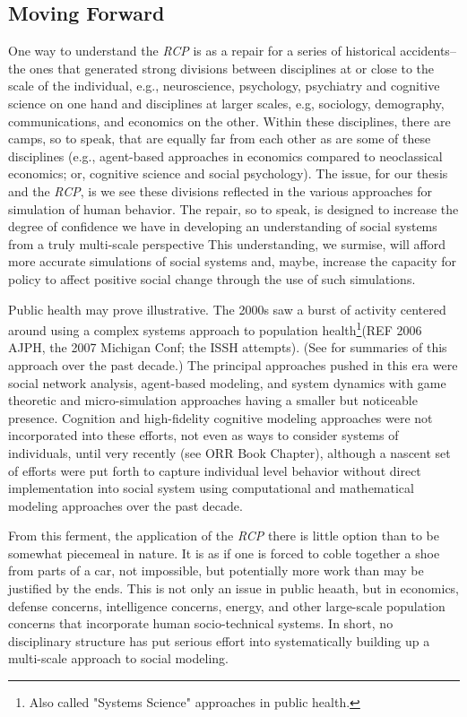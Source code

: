 \documentclass{article}
\begin{document}
\subsection{Moving Forward}
One way to understand the \textit{RCP} is as a repair for a series of historical accidents--the ones that generated strong divisions between disciplines at or close to the scale of the individual, e.g.,  neuroscience, psychology, psychiatry and cognitive science on one hand and disciplines at larger scales, e.g, sociology, demography, communications, and economics on the other.  Within these disciplines, there are camps, so to speak, that are equally far from each other as are some of these disciplines (e.g., agent-based approaches in economics compared to neoclassical economics; or, cognitive science and social psychology).  The issue, for our thesis and the \textit{RCP}, is we see these divisions reflected in the various approaches for simulation of human behavior.  The repair, so to speak, is designed to increase the degree of confidence we have in developing an understanding of social systems from a truly multi-scale perspective  This understanding, we surmise, will afford more accurate simulations of social systems and, maybe, increase the capacity for policy to affect positive social change through the use of such simulations.

Public health may prove illustrative.  The 2000s saw a burst of activity centered around using a complex systems approach to population health\footnote{Also called "Systems Science" approaches in public health.}(REF 2006 AJPH, the 2007 Michigan Conf; the ISSH attempts). (See \cite{Galea, 2017; Kaplan, 2017} for summaries of this approach over the past decade.)  The principal approaches pushed in this era were social network analysis, agent-based modeling, and system dynamics with game theoretic and micro-simulation approaches having a smaller but noticeable presence.  Cognition and high-fidelity cognitive modeling approaches were not incorporated into these efforts, not even as ways to consider systems of individuals, until very recently (see ORR Book Chapter), although a nascent set of efforts were put forth to capture individual level behavior without direct implementation into social system \cite{Orr 2017} using computational and mathematical modeling approaches over the past decade.

From this ferment, the application of the \textit{RCP} there is little option than to be somewhat piecemeal in nature.  It is as if one is forced to coble together a shoe from parts of a car, not impossible, but potentially more work than may be justified by the ends. This is not only an issue in public heaath, but in economics, defense concerns, intelligence concerns, energy, and other large-scale population concerns that incorporate human socio-technical systems.  In short, no disciplinary structure has put serious effort into systematically building up a multi-scale approach to social modeling.
\end{document}
